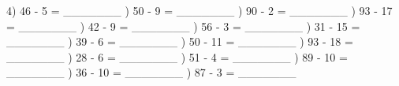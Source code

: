\documentclass{article}%
\begin{document}
4) 46 {-} 5 = \_\_\_\_\_\_\_%
\newline%
\newline%
) 50 {-} 9 = \_\_\_\_\_\_\_%
\newline%
\newline%
) 90 {-} 2 = \_\_\_\_\_\_\_%
\newline%
\newline%
) 93 {-} 17 = \_\_\_\_\_\_\_%
\newline%
\newline%
) 42 {-} 9 = \_\_\_\_\_\_\_%
\newline%
\newline%
) 56 {-} 3 = \_\_\_\_\_\_\_%
\newline%
\newline%
) 31 {-} 15 = \_\_\_\_\_\_\_%
\newline%
\newline%
) 39 {-} 6 = \_\_\_\_\_\_\_%
\newline%
\newline%
) 50 {-} 11 = \_\_\_\_\_\_\_%
\newline%
\newline%
) 93 {-} 18 = \_\_\_\_\_\_\_%
\newline%
\newline%
) 28 {-} 6 = \_\_\_\_\_\_\_%
\newline%
\newline%
) 51 {-} 4 = \_\_\_\_\_\_\_%
\newline%
\newline%
) 89 {-} 10 = \_\_\_\_\_\_\_%
\newline%
\newline%
) 36 {-} 10 = \_\_\_\_\_\_\_%
\newline%
\newline%
) 87 {-} 3 = \_\_\_\_\_\_\_%
\newline%
\end{document}
